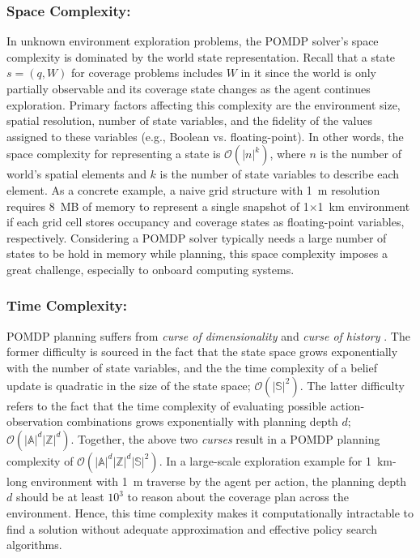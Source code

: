 \documentclass[letterpaper]{article} %
\begin{document}
\subsubsection{Space Complexity:} \hfill
\vspace{-0.25pt}

\noindent
In unknown environment exploration problems, the POMDP solver's space complexity is dominated by the world state representation.
Recall that a state $s = (q, W)$ for coverage problems includes $W$ in it since the world is only partially observable and its coverage state changes as the agent continues exploration.
Primary factors affecting this complexity are the environment size, spatial resolution, number of state variables, and the fidelity of the values assigned to these variables (e.g., Boolean vs. floating-point).
In other words, the space complexity for representing a state is $\mathcal{O}(|n|^k)$, where $n$ is the number of world's spatial elements and $k$ is the number of state variables to describe each element.
As a concrete example, a naive grid structure with 1~m resolution requires 8~MB of memory to represent a single snapshot of 1$\times$1~km environment if each grid cell stores occupancy and coverage states as floating-point variables, respectively.
Considering a POMDP solver typically needs a large number of states to be hold in memory while planning, this space complexity imposes a great challenge, especially to onboard computing systems.

\subsubsection{Time Complexity:} \hfill
\vspace{-0.25pt}

\noindent
POMDP planning suffers from \textit{curse of dimensionality} \cite{KLC98} and \textit{curse of history} \cite{Pineau03}.
The former difficulty is sourced in the fact that the state space grows exponentially with the number of state variables, and the the time complexity of a belief update is quadratic in the size of the state space; $\mathcal{O}(|\mathbb{S}|^2)$.
The latter difficulty refers to the fact that the time complexity of evaluating possible action-observation combinations grows exponentially with planning depth $d$; $\mathcal{O}(|\mathbb{A}|^d|\mathbb{Z}|^d)$.
Together, the above two \textit{curses} result in a POMDP planning complexity of $\mathcal{O}(|\mathbb{A}|^d|\mathbb{Z}|^d|\mathbb{S}|^2)$.
In a large-scale exploration example for 1~km-long environment with 1~m traverse by the agent per action, the planning depth $d$ should be at least $10^3$ to reason about the coverage plan across the environment.
Hence, this time complexity makes it computationally intractable to find a solution without adequate approximation and effective policy search algorithms.
\end{document}
